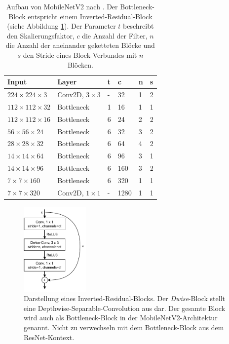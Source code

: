 \begin{table}
    \begin{tabularx}{\textwidth}{l|l|l|l|l|l}
        \hline
        Input & Layer & t & c & n & s \\
        \hline
        $224 \times 224 \times 3$ & Conv2D, $3 \times 3$ & - & 32 & 1 & 2 \\
        $112 \times 112 \times 32$ & Bottleneck & 1 & 16 & 1 & 1 \\
        $112 \times 112 \times 16$ & Bottleneck & 6 & 24 & 2 & 2 \\
        $56 \times 56 \times 24$ & Bottleneck & 6 & 32 & 3 & 2 \\
        $28 \times 28 \times 32$ & Bottleneck & 6 & 64 & 4 & 2 \\
        $14 \times 14 \times 64$ & Bottleneck & 6 & 96 & 3 & 1 \\
        $14 \times 14 \times 96$ & Bottleneck & 6 & 160 & 3 & 2 \\
        $7 \times 7 \times 160$ & Bottleneck & 6 & 320 & 1 & 1 \\
        $7 \times 7 \times 320$ & Conv2D, $1 \times 1$ & - & 1280 & 1 & 1 \\
        \hline
    \end{tabularx}
    \caption{Aufbau von MobileNetV2 nach \cite{sandler2019mobilenetv2}. Der
    Bottleneck-Block entspricht einem Inverted-Residual-Block (siehe Abbildung
    \ref{fig:inverted-residual}). Der Parameter $t$ beschreibt den
    Skalierungsfaktor, $c$ die Anzahl der Filter, $n$ die Anzahl der aneinander
    geketteten Blöcke und $s$ den Stride eines Block-Verbundes mit $n$ Blöcken.}
    \label{table:mobilenetv2}
\end{table}

\begin{figure}
    \centering
    \includegraphics[width=0.3\textwidth]{images/inverted_residual.pdf}
    \caption{Darstellung eines Inverted-Residual-Blocks. Der \textit{Dwise}-Block stellt eine Depthwise-Separable-Convolution aus \cite{howard2017mobilenets} dar. Der gesamte Block wird auch als Bottleneck-Block in der MobileNetV2-Architektur genannt. Nicht zu verwechseln mit dem Bottleneck-Block aus dem ResNet-Kontext.}
    \label{fig:inverted-residual}
\end{figure}

